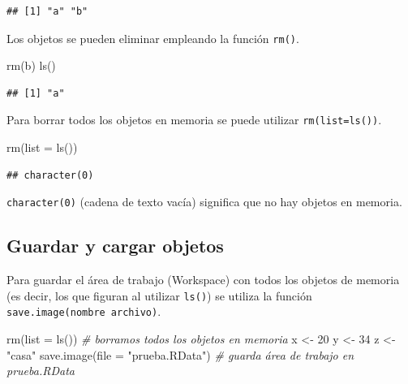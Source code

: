 \documentclass[
]{book}
\newenvironment{Shaded}{\begin{snugshade}}{\end{snugshade}}
\newcommand{\AttributeTok}[1]{\textcolor[rgb]{0.77,0.63,0.00}{#1}}
\newcommand{\CommentTok}[1]{\textcolor[rgb]{0.56,0.35,0.01}{\textit{#1}}}
\newcommand{\DecValTok}[1]{\textcolor[rgb]{0.00,0.00,0.81}{#1}}
\newcommand{\FunctionTok}[1]{\textcolor[rgb]{0.00,0.00,0.00}{#1}}
\newcommand{\NormalTok}[1]{#1}
\newcommand{\OtherTok}[1]{\textcolor[rgb]{0.56,0.35,0.01}{#1}}
\newcommand{\StringTok}[1]{\textcolor[rgb]{0.31,0.60,0.02}{#1}}
\theoremstyle{break}
\theoremstyle{nonumberplain}
\begin{document}
\begin{verbatim}
## [1] "a" "b"
\end{verbatim}

Los objetos se pueden eliminar empleando la función \texttt{rm()}.

\begin{Shaded}
\begin{Highlighting}[]
\FunctionTok{rm}\NormalTok{(b)}
\FunctionTok{ls}\NormalTok{()}
\end{Highlighting}
\end{Shaded}

\begin{verbatim}
## [1] "a"
\end{verbatim}

Para borrar todos los objetos en memoria se puede utilizar \texttt{rm(list=ls())}.

\begin{Shaded}
\begin{Highlighting}[]
\FunctionTok{rm}\NormalTok{(}\AttributeTok{list =} \FunctionTok{ls}\NormalTok{())}
\end{Highlighting}
\end{Shaded}

\begin{verbatim}
## character(0)
\end{verbatim}

\texttt{character(0)} (cadena de texto vacía) significa que no hay objetos en memoria.

\hypertarget{load-save}{%
\subsection{Guardar y cargar objetos}\label{load-save}}

Para guardar el área de trabajo (Workspace) con todos los objetos de memoria (es decir, los que figuran al utilizar \texttt{ls()}) se utiliza la función \texttt{save.image(nombre\ archivo)}.

\begin{Shaded}
\begin{Highlighting}[]
\FunctionTok{rm}\NormalTok{(}\AttributeTok{list =} \FunctionTok{ls}\NormalTok{()) }\CommentTok{\# borramos todos los objetos en memoria}
\NormalTok{x }\OtherTok{\textless{}{-}} \DecValTok{20}
\NormalTok{y }\OtherTok{\textless{}{-}} \DecValTok{34}
\NormalTok{z }\OtherTok{\textless{}{-}} \StringTok{"casa"}
\FunctionTok{save.image}\NormalTok{(}\AttributeTok{file =} \StringTok{"prueba.RData"}\NormalTok{) }\CommentTok{\# guarda área de trabajo en prueba.RData}
\end{Highlighting}
\end{Shaded}
\end{document}
